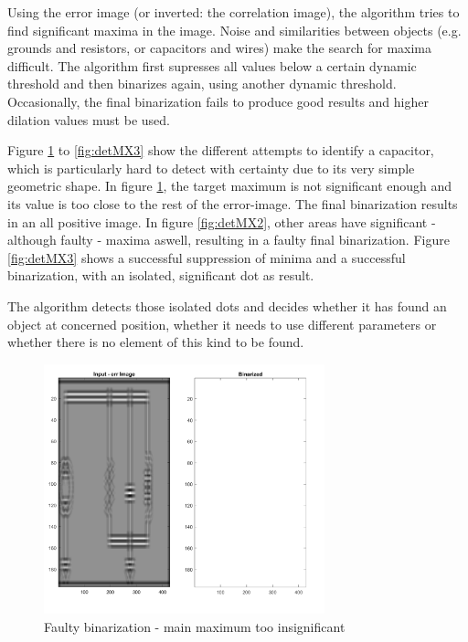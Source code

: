 \documentclass[10pt,twocolumn,letterpaper]{article}
\begin{document}
Using the error image (or inverted: the correlation image), the algorithm tries to find significant maxima in the image. Noise and similarities between objects (e.g. grounds and resistors, or capacitors and wires) make the search for maxima difficult. The algorithm first supresses all values below a certain dynamic threshold and then binarizes again, using another dynamic threshold. Occasionally, the final binarization fails to produce good results and higher dilation values must be used. 
\par
Figure \ref{fig:detMX1} to \ref{fig:detMX3} show the different attempts to identify a capacitor, which is particularly hard to detect with certainty due to its very simple geometric shape. In figure \ref{fig:detMX1}, the target maximum is not significant enough and its value is too close to the rest of the error-image. The final binarization results in an all positive image. In figure \ref{fig:detMX2}, other areas have significant - although faulty - maxima aswell, resulting in a faulty final binarization. Figure \ref{fig:detMX3} shows a successful suppression of minima and a successful binarization, with an isolated, significant dot as result. 
\par
The algorithm detects those isolated dots and decides whether it has found an object at concerned position, whether it needs to use different parameters or whether there is no element of this kind to be found.
\par

\begin{figure}[!ht]
\includegraphics[width = 3.2in]{img/detMX1.png}
\caption{Faulty binarization - main maximum too insignificant}
\label{fig:detMX1}
\end{figure}
\par
\end{document}
